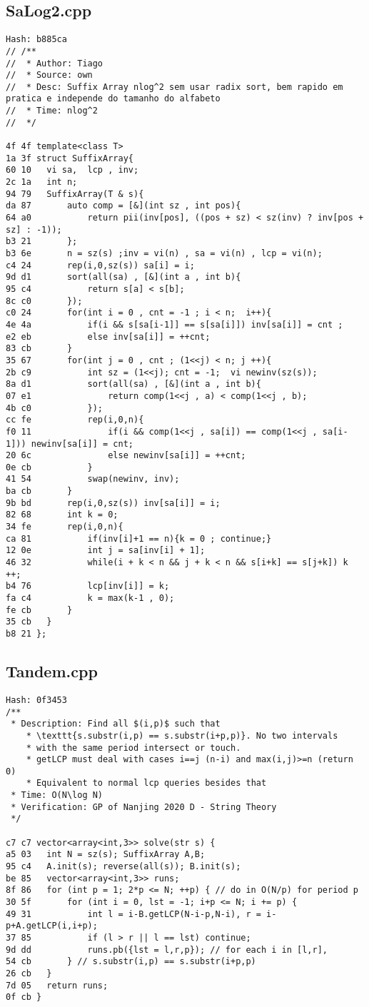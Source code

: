 \documentclass[11pt, a4paper, twoside]{article}
\begin{document}
\subsection{SaLog2.cpp}
\begin{lstlisting}
Hash: b885ca
// /**
//  * Author: Tiago
//  * Source: own
//  * Desc: Suffix Array nlog^2 sem usar radix sort, bem rapido em pratica e independe do tamanho do alfabeto
//  * Time: nlog^2 
//  */

4f 4f template<class T>
1a 3f struct SuffixArray{
60 10 	vi sa,  lcp , inv;
2c 1a 	int n;
94 79 	SuffixArray(T & s){
da 87 		auto comp = [&](int sz , int pos){
64 a0 			return pii(inv[pos], ((pos + sz) < sz(inv) ? inv[pos + sz] : -1)); 
b3 21 		};
b3 6e 		n = sz(s) ;inv = vi(n) , sa = vi(n) , lcp = vi(n);
c4 24 		rep(i,0,sz(s)) sa[i] = i;
9d d1 		sort(all(sa) , [&](int a , int b){
95 c4 			return s[a] < s[b];
8c c0 		});
c0 24 		for(int i = 0 , cnt = -1 ; i < n;  i++){
4e 4a 			if(i && s[sa[i-1]] == s[sa[i]]) inv[sa[i]] = cnt ;
e2 eb 			else inv[sa[i]] = ++cnt;
83 cb 		}
35 67 		for(int j = 0 , cnt ; (1<<j) < n; j ++){
2b c9 			int sz = (1<<j); cnt = -1;  vi newinv(sz(s));
8a d1 			sort(all(sa) , [&](int a , int b){
07 e1 				return comp(1<<j , a) < comp(1<<j , b);
4b c0 			});
cc fe 			rep(i,0,n){
f0 11 				if(i && comp(1<<j , sa[i]) == comp(1<<j , sa[i-1])) newinv[sa[i]] = cnt;
20 6c 				else newinv[sa[i]] = ++cnt;
0e cb 			}
41 54 			swap(newinv, inv);
ba cb 		}
9b bd 		rep(i,0,sz(s)) inv[sa[i]] = i;
82 68 		int k = 0;
34 fe 		rep(i,0,n){
ca 81 			if(inv[i]+1 == n){k = 0 ; continue;}
12 0e 			int j = sa[inv[i] + 1];
46 32 			while(i + k < n && j + k < n && s[i+k] == s[j+k]) k ++;
b4 76 			lcp[inv[i]] = k;
fa c4 			k = max(k-1 , 0);
fe cb 		}
35 cb 	}
b8 21 };
\end{lstlisting}

\subsection{Tandem.cpp}
\begin{lstlisting}
Hash: 0f3453
/**
 * Description: Find all $(i,p)$ such that 
 	* \texttt{s.substr(i,p) == s.substr(i+p,p)}. No two intervals
 	* with the same period intersect or touch.
	* getLCP must deal with cases i==j (n-i) and max(i,j)>=n (return 0)
	* Equivalent to normal lcp queries besides that
 * Time: O(N\log N)
 * Verification: GP of Nanjing 2020 D - String Theory
 */

c7 c7 vector<array<int,3>> solve(str s) {
a5 03 	int N = sz(s); SuffixArray A,B; 
95 c4 	A.init(s); reverse(all(s)); B.init(s);
be 85 	vector<array<int,3>> runs;
8f 86 	for (int p = 1; 2*p <= N; ++p) { // do in O(N/p) for period p
30 5f 		for (int i = 0, lst = -1; i+p <= N; i += p) {
49 31 			int l = i-B.getLCP(N-i-p,N-i), r = i-p+A.getLCP(i,i+p);
37 85 			if (l > r || l == lst) continue;
9d dd 			runs.pb({lst = l,r,p}); // for each i in [l,r],
54 cb 		} // s.substr(i,p) == s.substr(i+p,p)
26 cb 	}
7d 05 	return runs;
0f cb }
\end{lstlisting}
\end{document}
